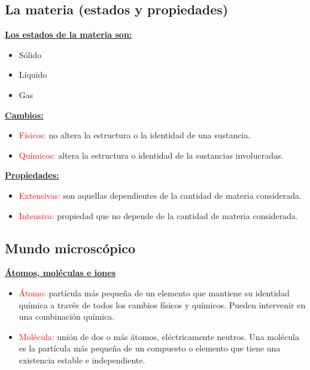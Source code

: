     \subsection{La materia (estados y propiedades)}
        \indent \textbf{\underline{Los estados de la materia son:}}
            \begin{itemize} 
                \item Sólido
                \item Líquido
                \item Gas
            \end{itemize}

        \indent \textbf{\underline{Cambios:}}
            \begin{itemize}
                \item \textcolor{red}{Físicos:} no altera la estructura o la identidad de una sustancia.
                \item \textcolor{red}{Químicos:} altera la estructura o identidad de la sustancias involucradas.
            \end{itemize} 

        \indent \textbf{\underline{Propiedades:}}
            \begin{itemize}
                \item \textcolor{red}{Extensivas:} son aquellas dependientes de la cantidad de materia considerada.
                \item \textcolor{red}{Intensiva:} propiedad que no depende de la cantidad de materia considerada.
            \end{itemize}
            
    \subsection{Mundo microscópico}
        \indent \textbf{\underline{Átomos, moléculas e iones}}
            \begin{itemize}
                \item \textcolor{red}{Átomo:} partícula más pequeña de un elemento que mantiene su identidad química a través de todos los cambios físicos y químicos. Pueden intervenir en una combinación química. 

                \item \textcolor{red}{Molécula:} unión de dos o más átomos, eléctricamente neutros. Una molécula es la partícula más pequeña de un compuesto o elemento que tiene una existencia estable e independiente.
            \end{itemize}

